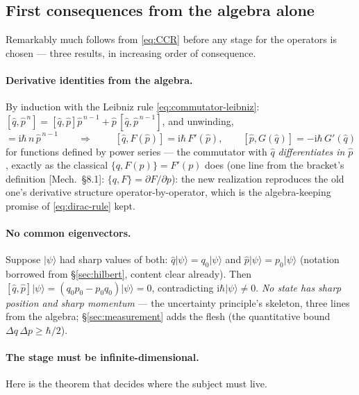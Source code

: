 \documentclass[11pt]{article}
\theoremstyle{plain}
\theoremstyle{definition}
\theoremstyle{remark}
\newcommand{\ii}{\mathrm{i}}
\newcommand{\op}[1]{\hat{#1}}
\newcommand{\ket}[1]{\lvert #1 \rangle}
\begin{document}
\subsection{First consequences from the algebra alone}
\label{sec:algebra-consequences}

Remarkably much follows from \eqref{eq:CCR} before any stage for the
operators is chosen --- three results, in increasing order of
consequence.

\paragraph{Derivative identities from the algebra.} By induction with the
Leibniz rule \eqref{eq:commutator-leibniz}:
$[\op q, \op p^{\,n}] = [\op q, \op p]\op p^{\,n-1} +
\op p\,[\op q, \op p^{\,n-1}]$, and unwinding,
\begin{equation}
  [\op q, \op p^{\,n}] = \ii\hbar\, n\,\op p^{\,n-1}
  \qquad\Longrightarrow\qquad
  \boxed{\;
  [\op q, F(\op p)] = \ii\hbar\, F'(\op p),
  \qquad
  [\op p, G(\op q)] = -\ii\hbar\, G'(\op q)
  \;}
  \label{eq:commutator-derivative}
\end{equation}
for functions defined by power series --- the commutator with $\op q$
\emph{differentiates in} $\op p$, exactly as the classical
$\{q, F(p)\} = F'(p)$ does (one line from the bracket's definition
[Mech.\ \S8.1]: $\{q, F\} = \partial F/\partial p$): the new
realization
reproduces the old one's derivative structure operator-by-operator,
which is the algebra-keeping promise of \eqref{eq:dirac-rule} kept.

\paragraph{No common eigenvectors.} Suppose $\ket{\psi}$ had sharp
values of both: $\op q\ket{\psi} = q_0\ket{\psi}$ and
$\op p\ket{\psi} = p_0\ket{\psi}$ (notation borrowed from
\S\ref{sec:hilbert}, content clear already). Then
$[\op q, \op p]\ket{\psi} = (q_0 p_0 - p_0 q_0)\ket{\psi} = 0$,
contradicting $\ii\hbar\ket{\psi} \ne 0$. \emph{No state has sharp
position and sharp momentum} --- the uncertainty principle's
skeleton, three lines from the algebra; \S\ref{sec:measurement} adds
the flesh (the quantitative bound $\Delta q\,\Delta p \ge \hbar/2$).

\paragraph{The stage must be infinite-dimensional.} Here is the
theorem that decides where the subject must live.
\end{document}
